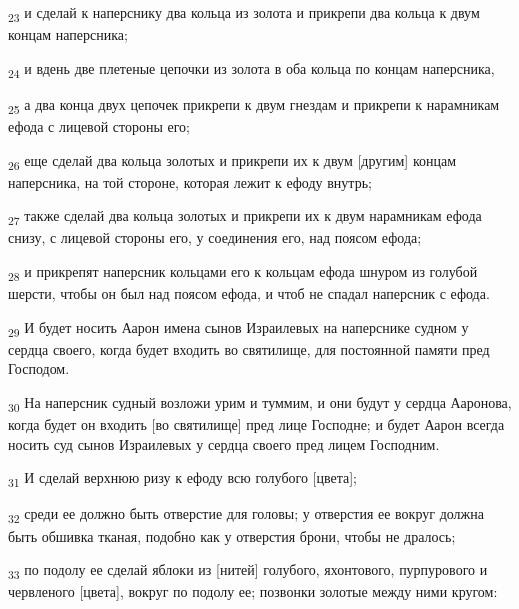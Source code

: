 \begin{tcolorbox}
\textsubscript{23} и сделай к наперснику два кольца из золота и прикрепи два кольца к двум концам наперсника;
\end{tcolorbox}
\begin{tcolorbox}
\textsubscript{24} и вдень две плетеные цепочки из золота в оба кольца по концам наперсника,
\end{tcolorbox}
\begin{tcolorbox}
\textsubscript{25} а два конца двух цепочек прикрепи к двум гнездам и прикрепи к нарамникам ефода с лицевой стороны его;
\end{tcolorbox}
\begin{tcolorbox}
\textsubscript{26} еще сделай два кольца золотых и прикрепи их к двум [другим] концам наперсника, на той стороне, которая лежит к ефоду внутрь;
\end{tcolorbox}
\begin{tcolorbox}
\textsubscript{27} также сделай два кольца золотых и прикрепи их к двум нарамникам ефода снизу, с лицевой стороны его, у соединения его, над поясом ефода;
\end{tcolorbox}
\begin{tcolorbox}
\textsubscript{28} и прикрепят наперсник кольцами его к кольцам ефода шнуром из голубой шерсти, чтобы он был над поясом ефода, и чтоб не спадал наперсник с ефода.
\end{tcolorbox}
\begin{tcolorbox}
\textsubscript{29} И будет носить Аарон имена сынов Израилевых на наперснике судном у сердца своего, когда будет входить во святилище, для постоянной памяти пред Господом.
\end{tcolorbox}
\begin{tcolorbox}
\textsubscript{30} На наперсник судный возложи урим и туммим, и они будут у сердца Ааронова, когда будет он входить [во святилище] пред лице Господне; и будет Аарон всегда носить суд сынов Израилевых у сердца своего пред лицем Господним.
\end{tcolorbox}
\begin{tcolorbox}
\textsubscript{31} И сделай верхнюю ризу к ефоду всю голубого [цвета];
\end{tcolorbox}
\begin{tcolorbox}
\textsubscript{32} среди ее должно быть отверстие для головы; у отверстия ее вокруг должна быть обшивка тканая, подобно как у отверстия брони, чтобы не дралось;
\end{tcolorbox}
\begin{tcolorbox}
\textsubscript{33} по подолу ее сделай яблоки из [нитей] голубого, яхонтового, пурпурового и червленого [цвета], вокруг по подолу ее; позвонки золотые между ними кругом:
\end{tcolorbox}
